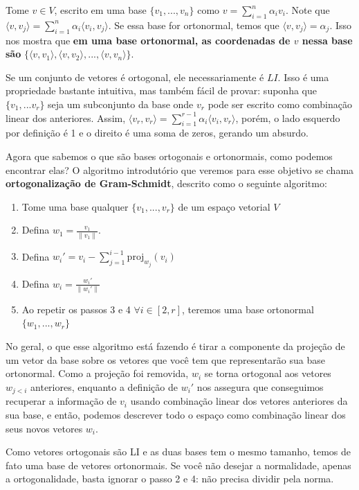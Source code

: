 \documentclass[11pt, a4paper]{article}
\begin{document}
Tome \(v \in V\), escrito em uma base \(\{v_1,...,v_n\}\) como \(v=\displaystyle \sum_{i=1}^{n}\alpha_i v_i\). Note que \(\langle v,v_j\rangle=\displaystyle \sum_{i=1}^{n}\alpha_i \langle v_i,v_j\rangle\). Se essa base for ortonormal, temos que \(\langle v,v_j\rangle=\alpha_j\). Isso nos mostra que \textbf{em uma base ortonormal, as coordenadas de \(v\) nessa base são} \(\{\langle v,v_1\rangle,\langle v,v_2\rangle,...,\langle v,v_n\rangle\}\).

Se um conjunto de vetores é ortogonal, ele necessariamente é \(LI\). Isso é uma propriedade bastante intuitiva, mas também fácil de provar: suponha que \(\{v_1,...v_r\}\) seja um subconjunto da base onde \(v_r\) pode ser escrito como combinação linear dos anteriores. Assim, \(\langle v_r,v_r \rangle=\displaystyle \sum_{i=1}^{r-1}{\alpha_i \langle v_i,v_r\rangle}\), porém, o lado esquerdo por definição é 1 e o direito é uma soma de zeros, gerando um absurdo.

Agora que sabemos o que são bases ortogonais e ortonormais, como podemos encontrar elas? O algoritmo introdutório que veremos para esse objetivo se chama \textbf{ortogonalização de Gram-Schmidt}, descrito como o seguinte algoritmo:

\begin{enumerate}
    \item Tome uma base qualquer \(\{v_1,...,v_r\}\) de um espaço vetorial \(V\)
    \item Defina \(w_1=\frac{v_1}{\|v_1\|}\).
    \item Defina \(w_i'=v_i-\displaystyle \sum_{j=1}^{i-1}{\text{proj}_{w_j}(v_i)}\)
    \item Defina \(w_i=\frac{w_i'}{\|w_i'\|}\)
    \item Ao repetir os passos 3 e 4 \(\forall i\in [2,r]\), teremos uma base ortonormal \(\{w_1,...,w_r\}\)
\end{enumerate}

No geral, o que esse algoritmo está fazendo é tirar a componente da projeção de um vetor da base sobre os vetores que você tem que representarão sua base ortonormal. Como a projeção foi removida, \(w_i\) se torna ortogonal aos vetores \(w_{j<i}\) anteriores, enquanto a definição de \(w_i'\) nos assegura que conseguimos recuperar a informação de \(v_i\) usando combinação linear dos vetores anteriores da sua base, e então, podemos descrever todo o espaço como combinação linear dos seus novos vetores \(w_i\).

Como vetores ortogonais são LI e as duas bases tem o mesmo tamanho, temos de fato uma base de vetores ortonormais. Se você não desejar a normalidade, apenas a ortogonalidade, basta ignorar o passo 2 e 4: não precisa dividir pela norma. 
\end{document}
